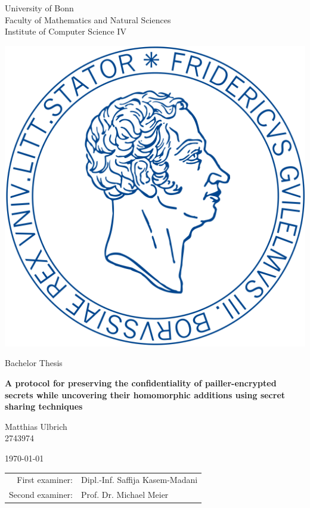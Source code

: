 \documentclass[12pt,a4paper]{scrartcl}				%
\begin{document}
\begin{titlepage}

\begin{center}

\large
University of Bonn \\
Faculty of Mathematics and Natural Sciences \\
Institute of Computer Science IV \\
\vspace*{1 cm} 

\includegraphics[scale=0.11]{UniBonnSiegel.png}{\centering}
\vspace*{3 cm}  
    
{\selectfont
	\Large
	Bachelor Thesis
	\vspace*{0.5cm}

	\LARGE 
	\textbf{A protocol for preserving the confidentiality of pailler-encrypted secrets while uncovering their homomorphic additions using secret sharing techniques}
	\vspace*{3 cm}       
}
  
Matthias Ulbrich \\  
2743974
\vspace{1 cm}

\today
\vspace*{1 cm}

\begin{tabular}{rl}
First examiner:  &Dipl.-Inf. Saffija Kasem-Madani \\
Second examiner: &Prof. Dr. Michael Meier
\end{tabular}

\end{center}
\end{titlepage}
\end{document}

